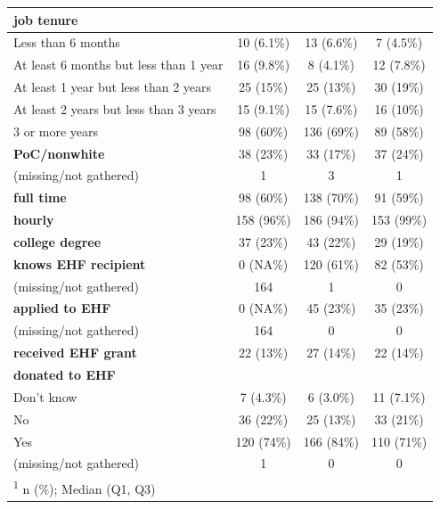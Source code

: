 \documentclass[
  11pt,
  oneside]{article}
\begin{document}
\begin{table}
\begin{tabular}[t]{l|c|c|c}
\hline
\textbf{job tenure} &  &  & \\
\hline
\hspace{1em}Less than 6 months & 10 (6.1\%) & 13 (6.6\%) & 7 (4.5\%)\\
\hline
\hspace{1em}At least 6 months but less than 1 year & 16 (9.8\%) & 8 (4.1\%) & 12 (7.8\%)\\
\hline
\hspace{1em}At least 1 year but less than 2 years & 25 (15\%) & 25 (13\%) & 30 (19\%)\\
\hline
\hspace{1em}At least 2 years but less than 3 years & 15 (9.1\%) & 15 (7.6\%) & 16 (10\%)\\
\hline
\hspace{1em}3 or more years & 98 (60\%) & 136 (69\%) & 89 (58\%)\\
\hline
\textbf{PoC/nonwhite} & 38 (23\%) & 33 (17\%) & 37 (24\%)\\
\hline
\hspace{1em}(missing/not gathered) & 1 & 3 & 1\\
\hline
\textbf{full time} & 98 (60\%) & 138 (70\%) & 91 (59\%)\\
\hline
\textbf{hourly} & 158 (96\%) & 186 (94\%) & 153 (99\%)\\
\hline
\textbf{college degree} & 37 (23\%) & 43 (22\%) & 29 (19\%)\\
\hline
\textbf{knows EHF recipient} & 0 (NA\%) & 120 (61\%) & 82 (53\%)\\
\hline
\hspace{1em}(missing/not gathered) & 164 & 1 & 0\\
\hline
\textbf{applied to EHF} & 0 (NA\%) & 45 (23\%) & 35 (23\%)\\
\hline
\hspace{1em}(missing/not gathered) & 164 & 0 & 0\\
\hline
\textbf{received EHF grant} & 22 (13\%) & 27 (14\%) & 22 (14\%)\\
\hline
\textbf{donated to EHF} &  &  & \\
\hline
\hspace{1em}Don’t know & 7 (4.3\%) & 6 (3.0\%) & 11 (7.1\%)\\
\hline
\hspace{1em}No & 36 (22\%) & 25 (13\%) & 33 (21\%)\\
\hline
\hspace{1em}Yes & 120 (74\%) & 166 (84\%) & 110 (71\%)\\
\hline
\hspace{1em}(missing/not gathered) & 1 & 0 & 0\\
\hline
\multicolumn{4}{l}{\rule{0pt}{1em}\textsuperscript{1} n (\%); Median (Q1, Q3)}\\
\end{tabular}
\end{table}
\end{document}
